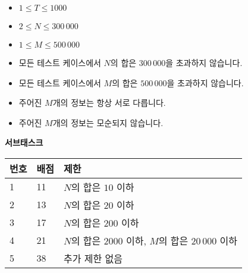 \begin{itemize}
\item $1 \le T \le 1000$
\item $2 \le N \le 300\,000$
\item $1 \le M \le 500\,000$
\item 모든 테스트 케이스에서 $N$의 합은 $300\,000$을 초과하지 않습니다.
\item 모든 테스트 케이스에서 $M$의 합은 $500\,000$을 초과하지 않습니다.
\item 주어진 $M$개의 정보는 항상 서로 다릅니다.
\item 주어진 $M$개의 정보는 모순되지 않습니다.
\end{itemize}

\textbf{서브태스크}

\begin{tabular}{|l|l|l|} \hline
  \textbf{번호} & \textbf{배점} & \textbf{제한} \\ \hline
  1 & 11 & $N$의 합은 $10$ 이하 \\ \hline
  2 & 13 & $N$의 합은 $20$ 이하 \\ \hline
  3 & 17 & $N$의 합은 $200$ 이하 \\ \hline
  4 & 21 & $N$의 합은 $2000$ 이하, $M$의 합은 $20\,000$ 이하 \\ \hline
  5 & 38 & 추가 제한 없음 \\ \hline
\end{tabular}